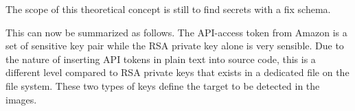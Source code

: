 The scope of this theoretical concept is still to find secrets with a fix schema.

This can now be summarized as follows. 
The API-access token from Amazon is a set of sensitive key pair while the RSA private key alone is very sensible. 
Due to the nature of inserting API tokens in plain text into source code, this is a different level compared to RSA private keys that exists in a dedicated file on the file system.
These two types of keys define the target to be detected in the images.
